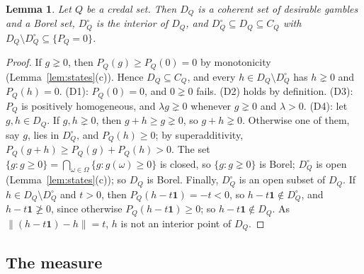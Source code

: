\documentclass[11pt]{article}
\newcommand{\one}{\mathbf{1}}
\theoremstyle{plain}
\newtheorem{lemma}[theorem]{Lemma}
\theoremstyle{definition}
\begin{document}
\begin{lemma}\label{lem:DQ}
Let $Q$ be a credal set. Then $D_Q$ is a coherent set of desirable gambles and a Borel set,
$D_Q^\circ$ is the interior of $D_Q$, and $D_Q^\circ\subseteq D_Q\subseteq C_Q$ with $D_Q\setminus
D_Q^\circ\subseteq\{P_Q=0\}$.
\end{lemma}

\begin{proof}
If $g\gneq0$, then $P_Q(g)\ge P_Q(0)=0$ by monotonicity (Lemma~\ref{lem:states}(c)). Hence
$D_Q\subseteq C_Q$, and every $h\in D_Q\setminus D_Q^\circ$ has $h\gneq0$ and $P_Q(h)=0$.
(D1): $P_Q(0)=0$, and $0\gneq0$ fails. (D2) holds by definition. (D3): $P_Q$ is positively
homogeneous, and $\lambda g\gneq0$ whenever $g\gneq0$ and $\lambda>0$. (D4): let $g,h\in D_Q$.
If $g,h\gneq0$, then $g+h\ge g\gneq0$, so $g+h\gneq0$. Otherwise one of them, say $g$, lies in
$D_Q^\circ$, and $P_Q(h)\ge0$; by superadditivity, $P_Q(g+h)\ge P_Q(g)+P_Q(h)>0$. The set
$\{g:g\ge0\}=\bigcap_{\omega\in\Omega}\{g:g(\omega)\ge0\}$ is closed, so $\{g:g\gneq0\}$ is
Borel; $D_Q^\circ$ is open (Lemma~\ref{lem:states}(c)); so $D_Q$ is Borel. Finally, $D_Q^\circ$
is an open subset of $D_Q$. If $h\in D_Q\setminus D_Q^\circ$ and $t>0$, then $P_Q(h-t\one)=-t
<0$, so $h-t\one\notin D_Q^\circ$, and $h-t\one\not\ge0$, since otherwise $P_Q(h-t\one)\ge0$; so
$h-t\one\notin D_Q$. As $\|(h-t\one)-h\|=t$, $h$ is not an interior point of $D_Q$.
\end{proof}

\subsection{The measure}
\end{document}

